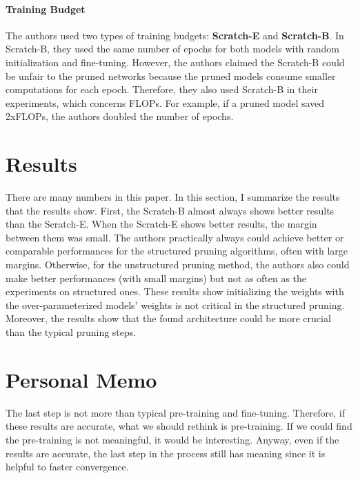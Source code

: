 \documentclass[10pt,twocolumn,letterpaper]{article}
\begin{document}
\paragraph{Training Budget}
The authors used two types of training budgets: \textbf{Scratch-E} and \textbf{Scratch-B}. In Scratch-B, they used the same number of epochs for both models with random initialization and fine-tuning. However, the authors claimed the Scratch-B could be unfair to the pruned networks because the pruned models consume smaller computations for each epoch. Therefore, they also used Scratch-B in their experiments, which concerns FLOPs. For example, if a pruned model saved 2xFLOPs, the authors doubled the number of epochs.

\section{Results}
There are many numbers in this paper. In this section, I summarize the results that the results show. First, the Scratch-B almost always shows better results than the Scratch-E. When the Scratch-E shows better results, the margin between them was small. The authors practically always could achieve better or comparable performances for the structured pruning algorithms, often with large margins. Otherwise, for the unstructured pruning method, the authors also could make better performances (with small margins) but not as often as the experiments on structured ones. These results show initializing the weights with the over-parameterized models' weights is not critical in the structured pruning. Moreover, the results show that the found architecture could be more crucial than the typical pruning steps.

\section{Personal Memo}
The last step is not more than typical pre-training and fine-tuning. Therefore, if these results are accurate, what we should rethink is pre-training. If we could find the pre-training is not meaningful, it would be interesting. Anyway, even if the results are accurate, the last step in the process still has meaning since it is helpful to faster convergence. 


{\small


}
\end{document}
